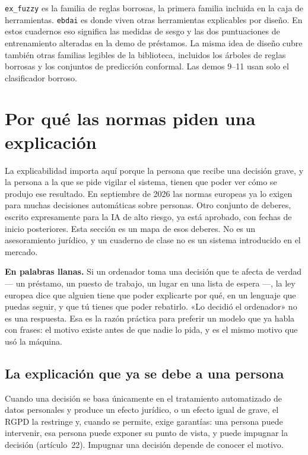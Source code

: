 \documentclass[11pt]{article}
\newcommand{\fn}[1]{\texttt{\small #1}}
\begin{document}
\fn{ex\_fuzzy} es la familia de reglas borrosas, la primera familia incluida en la caja de herramientas. \fn{ebdai} es donde viven otras herramientas explicables por diseño. En estos cuadernos eso significa las medidas de sesgo y las dos puntuaciones de entrenamiento alteradas en la demo de préstamos. La misma idea de diseño cubre también otras familias legibles de la biblioteca, incluidos los árboles de reglas borrosas y los conjuntos de predicción conformal. Las demos 9--11 usan solo el clasificador borroso.

\section{Por qué las normas piden una explicación}
\label{sec:law}

La explicabilidad importa aquí porque la persona que recibe una decisión grave, y la persona a la que se pide vigilar el sistema, tienen que poder ver cómo se produjo ese resultado. En septiembre de 2026 las normas europeas ya lo exigen para muchas decisiones automáticas sobre personas. Otro conjunto de deberes, escrito expresamente para la IA de alto riesgo, ya está aprobado, con fechas de inicio posteriores. Esta sección es un mapa de esos deberes. No es un asesoramiento jurídico, y un cuaderno de clase no es un sistema introducido en el mercado.

\begin{plainwords}
\textbf{En palabras llanas.} Si un ordenador toma una decisión que te afecta de verdad --- un préstamo, un puesto de trabajo, un lugar en una lista de espera ---, la ley europea dice que alguien tiene que poder explicarte por qué, en un lenguaje que puedas seguir, y que tú tienes que poder rebatirlo. «Lo decidió el ordenador» no es una respuesta. Esa es la razón práctica para preferir un modelo que ya habla con frases: el motivo existe antes de que nadie lo pida, y es el mismo motivo que usó la máquina.
\end{plainwords}

\subsection{La explicación que ya se debe a una persona}

Cuando una decisión se basa únicamente en el tratamiento automatizado de datos personales y produce un efecto jurídico, o un efecto igual de grave, el RGPD la restringe y, cuando se permite, exige garantías: una persona puede intervenir, esa persona puede exponer su punto de vista, y puede impugnar la decisión (artículo~22). Impugnar una decisión depende de conocer el motivo.
\end{document}
